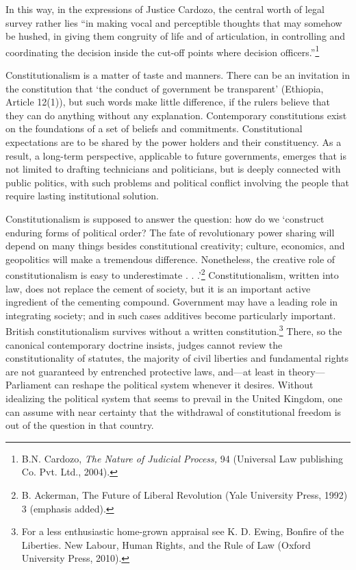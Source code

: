 \begin{multicols}{2}
\vspace{-.1cm}

\noi
In this way, in the expressions of Justice Cardozo, the central worth of legal survey rather lies
“in making vocal and perceptible thoughts that may somehow be hushed, in giving them
congruity of life and of articulation, in controlling and coordinating the decision inside the
cut-off points where decision officers.”\footnote{B.N. Cardozo, \textit{The Nature of Judicial Process,} 94 (Universal Law publishing Co. Pvt. Ltd., 2004).}

\vspace{-.1cm}


\vspace{-.1cm}

\noi
Constitutionalism is a matter of taste and manners. There can be an invitation in the
constitution that ‘the conduct of government be transparent’ (Ethiopia, Article 12(1)), but
such words make little difference, if the rulers believe that they can do anything without any
explanation. Contemporary constitutions exist on the foundations of a set of beliefs and
commitments. Constitutional expectations are to be shared by the power holders and their
constituency. As a result, a long-term perspective, applicable to future governments, emerges
that is not limited to drafting technicians and politicians, but is deeply connected with public
politics, with such problems and political conflict involving the people that require lasting
institutional solution.

\vspace{-.1cm}

\noi
Constitutionalism is supposed to answer the question: how do we ‘construct enduring forms
of political order? The fate of revolutionary power sharing will depend on many things
besides constitutional creativity; culture, economics, and geopolitics will make a tremendous
difference. Nonetheless, the creative role of constitutionalism is easy to underestimate . . .’\footnote{B. Ackerman, The Future of Liberal Revolution (Yale University Press, 1992) 3 (emphasis added).}
Constitutionalism, written into law, does not replace the cement of society, but it is an
important active ingredient of the cementing compound. Government may have a leading role
in integrating society; and in such cases additives become particularly important.
British constitutionalism survives without a written constitution.\footnote{For a less enthusiastic home-grown appraisal see K. D. Ewing, Bonfire of the Liberties. New Labour, Human Rights, and the Rule of Law (Oxford University Press, 2010).} There, so the canonical contemporary doctrine insists, judges cannot review the constitutionality of statutes, the majority of civil liberties and fundamental rights are not guaranteed by entrenched protective laws, and—at least in theory—Parliament can reshape the political system whenever it
desires. Without idealizing the political system that seems to prevail in the United Kingdom,
one can assume with near certainty that the withdrawal of constitutional freedom is out of the
question in that country.


\end{multicols}
